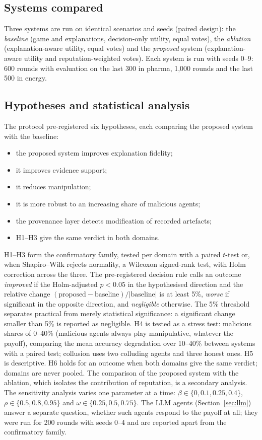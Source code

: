 \documentclass[pdflatex,sn-basic]{sn-jnl}
\begin{document}
\subsection{Systems compared}\label{sec:systems}

Three systems are run on identical scenarios and seeds (paired design): the \emph{baseline}
(game and explanations, decision-only utility, equal votes), the \emph{ablation}
(explanation-aware utility, equal votes) and the \emph{proposed} system (explanation-aware
utility and reputation-weighted votes). Each system is run with seeds 0--9: 600 rounds with
evaluation on the last 300 in pharma, 1{,}000 rounds and the last 500 in energy.

\subsection{Hypotheses and statistical analysis}\label{sec:hypotheses}

The protocol pre-registered six hypotheses, each comparing the proposed system with the
baseline:
\begin{itemize}
\item[H1] the proposed system improves explanation fidelity;
\item[H2] it improves evidence support;
\item[H3] it reduces manipulation;
\item[H4] it is more robust to an increasing share of malicious agents;
\item[H5] the provenance layer detects modification of recorded artefacts;
\item[H6] H1--H3 give the same verdict in both domains.
\end{itemize}
H1--H3 form the confirmatory family, tested per domain with a paired $t$-test or, when
Shapiro--Wilk rejects normality, a Wilcoxon signed-rank test, with Holm correction
\citep{holm1979} across the three. The pre-registered decision rule calls an outcome
\emph{improved} if the Holm-adjusted $p<0.05$ in the hypothesised direction and the relative
change $(\text{proposed}-\text{baseline})/|\text{baseline}|$ is at least 5\%, \emph{worse} if
significant in the opposite direction, and \emph{negligible} otherwise. The 5\% threshold
separates practical from merely statistical significance: a significant change smaller than
5\% is reported as negligible. H4 is tested as a stress test: malicious shares of 0--40\%
(malicious agents always play manipulative, whatever the payoff), comparing the mean accuracy
degradation over 10--40\% between systems with a paired test; collusion uses two colluding
agents and three honest ones. H5 is descriptive. H6 holds for an outcome when both domains
give the same verdict; domains are never pooled. The comparison of the proposed system with
the ablation, which isolates the contribution of reputation, is a secondary analysis. The
sensitivity analysis varies one parameter at a time: $\beta\in\{0,0.1,0.25,0.4\}$,
$\rho\in\{0.5,0.8,0.95\}$ and $\omega\in\{0.25,0.5,0.75\}$. The LLM agents (Section~\ref{sec:llm})
answer a separate question, whether such agents respond to the payoff at all; they were run
for 200 rounds with seeds 0--4 and are reported apart from the confirmatory family.
\end{document}
